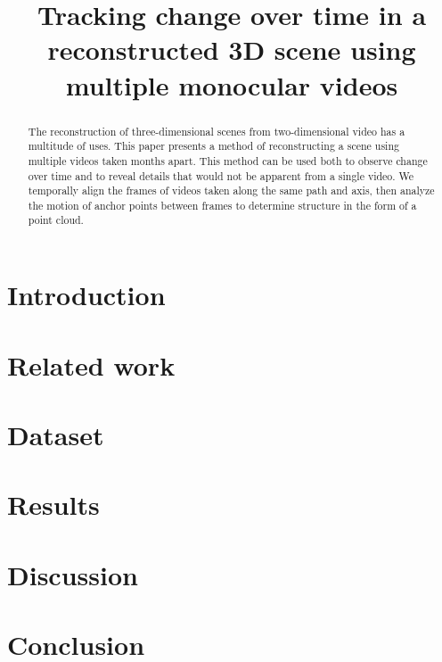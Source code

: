 \documentclass[conference]{IEEEtran}
\begin{document}
\title{Tracking change over time in a reconstructed 3D scene using multiple monocular videos}

\author{
}

\maketitle

\begin{abstract}
The reconstruction of three-dimensional scenes from two-dimensional video has a multitude of uses.
This paper presents a method of reconstructing a scene using multiple videos taken months apart.
This method can be used both to observe change over time and to reveal details that would not be apparent from a single video.
We temporally align the frames of videos taken along the same path and axis, then analyze the motion of anchor points between
frames to determine structure in the form of a point cloud. 
\end{abstract}

\begin{IEEEkeywords}
\end{IEEEkeywords}

\section{Introduction}


\section{Related work}


\section{Dataset}


\section{Results}


\section{Discussion}


\section{Conclusion}





\end{document}
